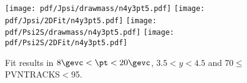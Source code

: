\begin{figure}[H]
\begin{center}
\texttt{[image: pdf/Jpsi/drawmass/n4y3pt5.pdf]}
\texttt{[image: pdf/Jpsi/2DFit/n4y3pt5.pdf]}
\vspace*{-0.5cm}
\texttt{[image: pdf/Psi2S/drawmass/n4y3pt5.pdf]}
\texttt{[image: pdf/Psi2S/2DFit/n4y3pt5.pdf]}
\vspace*{-0.5cm}
\end{center}
\caption{Fit results in $8\gevc<\pt<20\gevc$, $3.5<y<4.5$ and 70$\leq$PVNTRACKS$<$95.}
\label{Fitn4y3pt5}
\end{figure}
